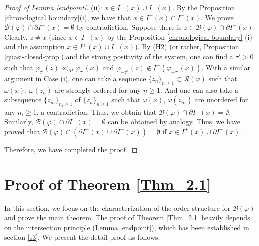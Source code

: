 \documentclass[a4paper,11pt]{article}
\theoremstyle{plain}
\theoremstyle{definition}
\numberwithin{equation}{section}
\begin{document}
\begin{proof}[Proof of Lemma \ref{endpoint}]
    (ii): $x\in I^{+}(x)\cup I^{-}(x)$. By the Proposition \ref{chronological boundary}(i), we have that $x\in I^{+}(x)\cap I^{-}(x)$. We prove $\mathcal{B}(\varphi) \cap \partial  I^{-}(x) = \emptyset$ by contradiction. Suppose there is $z\in \mathcal{B}(\varphi)\cap \partial  I^{-}(x)$. Clearly, $z\neq x$ (since $x\in I^{-}(x)$ by the Proposition \ref{chronological boundary} (i) and the assumption $x\in I^{+}(x)\cup I^{-}(x)$). By \textnormal{(H2)} (or rather, Proposition \ref{quasi-closed-prop}) and the strong positivity of the system, one can find a $\tau'>0$ such that $\varphi_{\tau'}(z)\ll_M\varphi_{\tau'}(x)$ and $\varphi_{-\tau'}(z)\notin \overline{I^{-}(\varphi_{-\tau'}(x))}$. With a similar argument in Case (i), one can take a sequence $\{z_n\}_{n\geq1} \subset \mathcal{R}(\varphi)$ such that $\omega(x)$, $\omega(z_n)$ are strongly ordered for any $n\geq1$. And one can also take a subsequence $\{z_{n_i}\}_{n_i\geq1}$ of $\{z_n\}_{n\geq1}$ such that $\omega(x)$, $\omega(z_{n_i})$ are unordered for any ${n_i}\geq1$, a contradiction. Thus, we obtain that $\mathcal{B}(\varphi) \cap \partial  I^{-}(x) = \emptyset$. Similarly, $\mathcal{B}(\varphi) \cap \partial  I^{+}(x) = \emptyset$ can be obtained by analogy. Thus, we have proved that $\mathcal{B}(\varphi)\cap (\partial  I^{+}(x)\cup \partial  I^{-}(x))=\emptyset$ if $x\in I^{+}(x)\cup \partial I^{-}(x)$.
    
    Therefore, we have completed the proof.
	\end{proof}
	
	\noindent\section{Proof of Theorem \ref{Thm_2.1}}\label{Limit dich}

    In this section, we focus on the characterization of the order structure for $\mathcal{B}(\varphi)$ and prove the main theorem. The proof of Theorem \ref{Thm_2.1} heavily depends on the intersection principle (Lemma \ref{endpoint}), which has been established in section \ref{s3}. We present the detail proof as follows:
	
\end{document}
